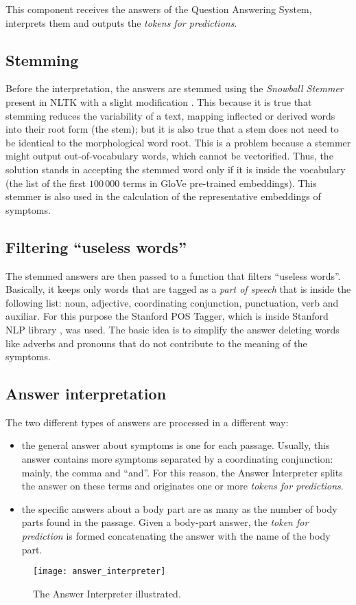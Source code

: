 This component receives the answers of the Question Answering System, interprets them and outputs the \textit{tokens for predictions}.

\subsection{Stemming}
\label{sec:stemming}
Before the interpretation, the answers are stemmed using the \textit{Snowball Stemmer} present in NLTK with a slight modification \cite{snowballstemmer, nltk}. This because it is true that stemming reduces the variability of a text, mapping inflected or derived words into their root form (the stem); but it is also true that a stem does not need to be identical to the morphological word root. This is a problem because a stemmer might output out-of-vocabulary words, which cannot be vectorified. Thus, the solution stands in accepting the stemmed word only if it is inside the vocabulary (the list of the first $100\,000$ terms in GloVe pre-trained embeddings). This stemmer is also used in the calculation of the representative embeddings of symptoms.

\subsection{Filtering ``useless words''}
The stemmed answers are then passed to a function that filters ``useless words''. Basically, it keeps only words that are tagged as a \textit{part of speech} that is inside the following list: noun, adjective, coordinating conjunction, punctuation, verb and auxiliar. For this purpose the Stanford POS Tagger, which is inside Stanford NLP library \cite{stanfordnlp}, was used. The basic idea is to simplify the answer deleting words like adverbs and pronouns that do not contribute to the meaning of the symptoms.

\subsection{Answer interpretation}
The two different types of answers are processed in a different way:
\begin{itemize}
  \item the general answer about symptoms is one for each passage. Usually, this answer contains more symptoms separated by a coordinating conjunction: mainly, the comma and ``and''. For this reason, the Answer Interpreter splits the answer on these terms and originates one or more \textit{tokens for predictions}.
  \item the specific answers about a body part are as many as the number of body parts found in the passage. Given a body-part answer, the \textit{token for prediction} is formed concatenating the answer with the name of the body part.
\end{itemize}

\begin{figure}[h]
\centering
\texttt{[image: answer\_interpreter]}
\caption{The Answer Interpreter illustrated.}
\medskip
\label{fig:answer_int}
\end{figure}
